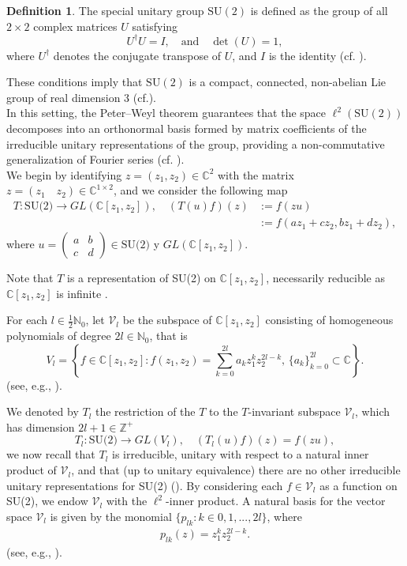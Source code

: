 \documentclass[11pt]{article}
\theoremstyle{definition}
\newtheorem{defn}[thm]{Definition}
\theoremstyle{remark}
\numberwithin{equation}{section}
\begin{document}
 \begin{defn}
The special unitary group $\text{SU}(2)$ is defined as the group of all $2 \times 2$ complex matrices $U$ satisfying
\[
U^\dagger U = I, \quad \text{and} \quad \det(U) = 1,
\]
where $U^\dagger$ denotes the conjugate transpose of $U$, and $I$ is the identity  (cf. \cite{ruzhansky2009pseudo,Faraut_2008}).
 \end{defn}
 
 These conditions imply that $\text{SU}(2)$ is a compact, connected, non-abelian Lie group of real dimension 3 (cf.\cite{Preli}).\\%

In this setting, the Peter–Weyl theorem guarantees that the space $\ell^2(\text{SU}(2))$ decomposes into an orthonormal basis formed by matrix coefficients of the irreducible unitary representations of the group, providing a non-commutative generalization of Fourier series (cf. \cite{ruzhansky2009pseudo}).\\%


We begin by identifying $z= (z_1,z_2) \in \mathbb{C}^2$ with the matrix $z=(z_1 \quad z_2 ) \in \mathbb{C}^{1\times 2}$, and we consider the following map
\begin{align*}
    T: \text{SU(2)}  \rightarrow GL(\mathbb{C}[z_1, z_2]), \quad (T(u)f)(z) &:= f(zu)\\
    &:=f(az_1 + cz_2, bz_1 + dz_2),
\end{align*}
where $u=\begin{pmatrix}
    a & b \\
    c &d
\end{pmatrix}
\in  \text{SU(2)} $ y \( GL(\mathbb{C}[z_1, z_2]) \).

 Note that $T$ is a representation of SU(2) on $\mathbb{C}[z_1,z_2]$, necessarily reducible as $\mathbb{C}[z_1,z_2]$ is infinite \cite[p. 612]{ruzhansky2009pseudo}.

For each $l \in \frac{1}{2}\mathbb{N}_0$, let $\mathcal{V}_l$ be the subspace of $\mathbb{C}[z_1,z_2]$ consisting of homogeneous polynomials of degree $2l \in \mathbb{N}_0$, that is
\[
V_l = \left\{ f \in \mathbb{C}[z_1, z_2] : f(z_1, z_2) = \sum_{k=0}^{2l} a_k z_1^k z_2^{2l-k}, \, \{a_k\}_{k=0}^{2l} \subset \mathbb{C} \right\}.
\]
(see, e.g., \cite{ruzhansky2009pseudo}).

We denoted by $T_l$ the restriction of the $T$ to the $T$-invariant subspace $\mathcal{V}_l$, which has dimension $2l+1 \in \mathbb{Z}^{+}$
\[
T_l: \text{SU(2)}  \rightarrow GL(V_l), \quad (T_l(u)f)(z) = f(zu),
\]
we now recall that $T_l$ is irreducible, unitary with respect to a natural inner product of $\mathcal{V}_l$, and that (up to unitary equivalence) there are no other irreducible unitary representations for SU(2) (\cite[p. 612]{ruzhansky2009pseudo}). By considering each $f\in \mathcal{V}_l$ as a function on SU(2), we endow $\mathcal{V}_l$ with the $\ell^2$-inner product. A natural basis for the vector space $\mathcal{V}_l$ is given by the monomial $\{p_{lk}:k\in0,1,...,2l\}$, where
\begin{align}\label{Polinomio_Plk}
    p_{lk}(z) = z_1^k z_2^{2l-k}.
\end{align} 
(see, e.g., \cite{ruzhansky2009pseudo}).\\
\end{document}
